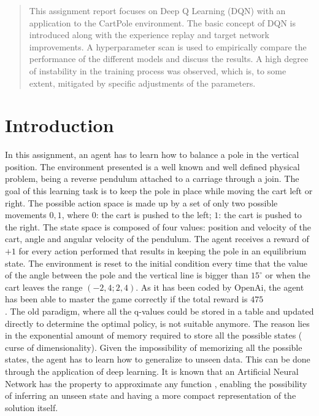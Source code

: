 \documentclass{article}
\begin{document}
\begin{abstract}
This assignment report focuses on Deep Q Learning (DQN)
with an application to the CartPole environment. 
The basic concept of DQN is introduced along with the experience replay 
and target network improvements.
A hyperparameter scan is used to empirically compare the performance of
the different models and discuss the results.    
A high degree of instability in the training process was observed, 
which is, to some extent, mitigated by specific adjustments of the parameters.
\end{abstract}

\section{Introduction}
\label{sec_introduction}
In this assignment, an agent has to learn how to balance a pole in the vertical position. 
The environment presented is a well known and well defined physical problem, being a reverse pendulum attached to a carriage through a join. 
The goal of this learning task is to keep the pole in place while moving the cart left or right.
The possible action space is made up by a set of only two possible movements ${0,1}$, where $0$: the cart is pushed to the left; $1$: the cart is pushed to the right. 
The state space is composed of four values: position and velocity of the cart, angle and angular velocity of the pendulum.
The agent receives a reward of $+1$ for every action performed that results in keeping the pole in an equilibrium state. 
The environment is reset to the initial condition every time that the value of the angle between the pole and the vertical line is bigger than $15^\circ$ or when the cart leaves the range $(-2,4;2,4)$. 
As it has been coded by OpenAi, the agent has been able to master the game correctly if the total reward is $475$\\.
The old paradigm, where all the q-values could be stored in a table and updated directly to determine the optimal policy, is not suitable anymore. 
The reason lies in the exponential amount of memory required to store all the possible states ( curse of dimensionality). 
Given the impossibility of memorizing all the possible states, the agent has to learn how to generalize to unseen data. 
This can be done through the application of deep learning. It is known that an Artificial Neural Network has the property to approximate any function \cite{Cybenko}, enabling the possibility of inferring an unseen state and having a more compact representation of the solution itself. 
\end{document}
